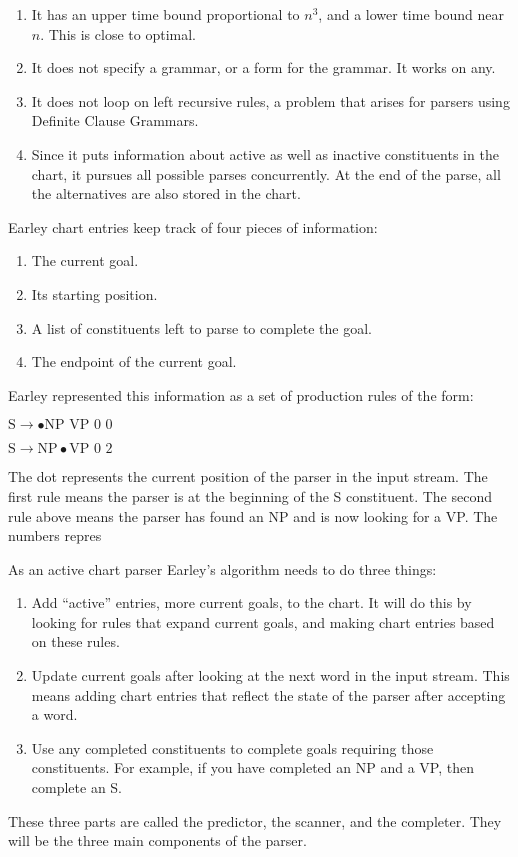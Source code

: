 \documentclass[12pt]{article}
\begin{document}
\begin{enumerate}

\item It has an upper time bound proportional to $n^{3}$, and a lower time bound near $n$.  This is close to optimal.
\item It does not specify a grammar, or a form for the grammar.  It works on any.
\item It does not loop on left recursive rules, a problem that arises for parsers using Definite Clause Grammars.
\item Since it puts information about active as well as inactive constituents in the chart, it pursues all possible parses concurrently.  At the end of the parse, all the alternatives are also stored in the chart.
\end{enumerate}
Earley chart entries keep track of four pieces of information:

\begin{enumerate}

\item The current goal.
\item Its starting position.
\item   A list of constituents left to parse to complete the goal.
\item The endpoint of the current goal.

\end{enumerate}
Earley represented this information as a set of production rules of the form:

\begin{center}
$ \mbox{S} \rightarrow \bullet \mbox{NP VP 0 0} $
\end{center}

\begin{center}
$ \mbox{S} \rightarrow  \mbox{NP} \bullet \mbox{VP 0 2} $
\end{center}
The dot represents the current position of the parser in the input stream.  The first rule means the parser is at the beginning of the S constituent.  The second rule above means the parser has found an NP and is now looking for a VP.  The numbers repres

As an active chart parser Earley's algorithm needs to do three things:
\begin{enumerate}
\item Add ``active'' entries, more current goals, to the chart. It will do this by looking for rules that expand current goals, and making chart entries based on these rules.
\item Update current goals after looking at the next word in the input stream.  This means adding chart entries that reflect the state of the parser after accepting a word.
\item Use any completed constituents to complete goals requiring those constituents.  For example, if you have completed an NP and a VP, then complete an S.
\end{enumerate}
These three parts are called the predictor, the scanner, and the completer.  They will be the three main components of the parser.
\end{document}
